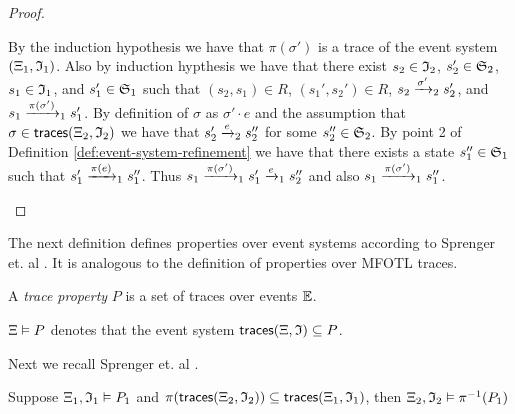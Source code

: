 \begin{proof}
\begin{itemize}
            By the induction hypothesis we have that
            $\pi(\sigma')$ is a trace of the event system
            $(\EventSystem_1, \Initialstates_1)$.
            Also by induction hypthesis we have that there exist
            $s_2 \in \Initialstates_2$, $s_2' \in \Statespace_2$,
            $s_1 \in \Initialstates_1$, and $s_1' \in \Statespace_1$
            such that $(s_2, s_1) \in R$, $(s_1', s_2') \in R$,
            $s_2 \Transitionrelation{2}{\sigma'} s_2'$, and
            $s_1 \Transitionrelation{1}{\pi(\sigma')} s_1'$.
            By definition of $\sigma$ as $\sigma' \cdot e$
            and the assumption that
            $\sigma \in \EStraces(\EventSystem_2, \Initialstates_2)$
            we have that $s_2' \Transitionrelation{2}{e} s_2''$ for some
            $s_2'' \in \Statespace_2$.
            By point 2 of Definition \ref{def:event-system-refinement}
            we have that there exists a state $s_1'' \in \Statespace_1$
            such that $s_1' \Transitionrelation{1}{\pi(e)} s_1''$.
            Thus
            $s_1 \Transitionrelation{1}{\pi(\sigma')} s_1'
            \Transitionrelation{1}{e} s_2''$ and also
            $s_1 \Transitionrelation{1}{\pi(\sigma')} s_1''$.
    \end{itemize}
\end{proof}
The next definition defines properties over event systems according
to Sprenger et. al \cite[Section 2.1.1]{igloo}.
It is analogous to the definition of properties over MFOTL traces.
\begin{definition}
    \label{def:event-system-trace-property}
    A \emph{trace property} $P$ is a set of traces over events $\Events$.
\end{definition}
$\EventSystem \vDash P$ denotes that the event system
$\EStraces(\EventSystem, \Initialstates) \subseteq P$.

Next we recall Sprenger et. al \cite[Lemma 2.2]{igloo}.
\begin{lemma}
    \label{lem:refinement-property-fullfillment}
    Suppose $\EventSystem_1, \Initialstates_1 \vDash P_1$
    and $\pi(\EStraces(\EventSystem_2, \Initialstates_2)) \subseteq
    \EStraces(\EventSystem_1, \Initialstates_1)$, then
    $\EventSystem_2, \Initialstates_2 \vDash \pi^{-1}(P_1)$
\end{lemma}

